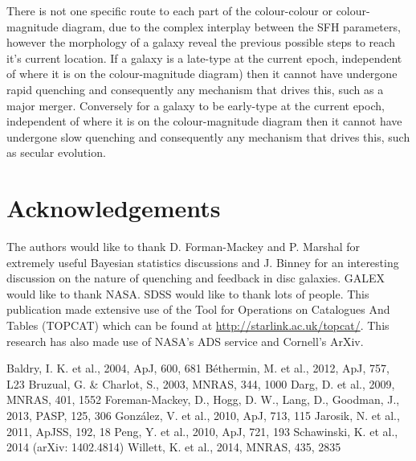 \documentclass{mn2e}
\begin{document}
There is not one specific route to each part of the colour-colour or colour-magnitude diagram, due to the complex interplay between the SFH parameters, however the morphology of a galaxy reveal the previous possible steps to reach it's current location. If a galaxy is a late-type at the current epoch, independent of where it is on the colour-magnitude diagram) then it cannot have undergone rapid quenching and consequently any mechanism that drives this, such as a major merger. Conversely for a galaxy to be early-type at the current epoch, independent of where it is on the colour-magnitude diagram then it cannot have undergone slow quenching and consequently any mechanism that drives this, such as secular evolution. 

\section*{Acknowledgements}
The authors would like to thank D. Forman-Mackey and P. Marshal for extremely useful Bayesian statistics discussions and J. Binney for an interesting discussion on the nature of quenching and feedback in disc galaxies. GALEX would like to thank NASA. SDSS would like to thank lots of people. This publication made extensive use of the Tool for Operations on Catalogues And Tables (TOPCAT) which can be found at \url{http://starlink.ac.uk/topcat/}. This research has also made use of NASA's ADS service and Cornell's ArXiv. 

\begin{thebibliography}{}
 Baldry, I. K. et al., 2004, ApJ, 600, 681
 B\'ethermin, M. et al., 2012, ApJ, 757, L23
 Bruzual, G. \& Charlot, S., 2003, MNRAS, 344, 1000
 Darg, D. et al., 2009, MNRAS, 401, 1552
 Foreman-Mackey, D., Hogg, D. W., Lang, D., Goodman, J., 2013, PASP, 125, 306
 Gonz\'alez, V. et al., 2010, ApJ, 713, 115
 Jarosik, N. et al., 2011, ApJSS, 192, 18
 Peng, Y. et al., 2010, ApJ, 721, 193
 Schawinski, K. et al., 2014 (arXiv: 1402.4814)
 Willett, K. et al., 2014, MNRAS, 435, 2835
\end{thebibliography}
\end{document}
